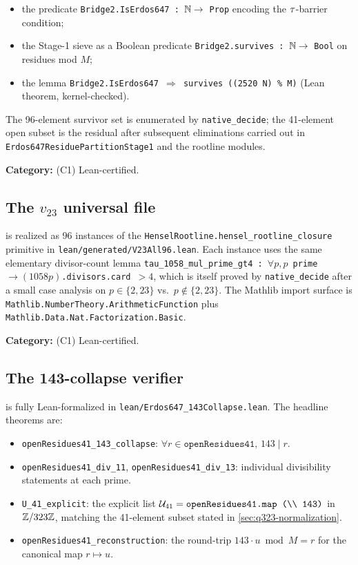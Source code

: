 \begin{itemize}[leftmargin=*]
\item the predicate \texttt{Bridge2.IsErdos647 : $\mathbb{N} \to$ Prop}
  encoding the $\tau$-barrier condition;
\item the Stage-1 sieve as a Boolean predicate
  \texttt{Bridge2.survives : $\mathbb{N} \to$ Bool} on residues mod $M$;
\item the lemma
  \texttt{Bridge2.IsErdos647 $\Rightarrow$ survives ((2520 N) \% M)}
  (Lean theorem, kernel-checked).
\end{itemize}

The 96-element survivor set is enumerated by
\texttt{native\_decide}; the 41-element open subset is the residual
after subsequent eliminations carried out in
\texttt{Erdos647ResiduePartitionStage1} and the rootline modules.

\textbf{Category:} (C1) Lean-certified.

\subsection{The $v_{23}$ universal file}
\label{sec:lean-v23}

 is realized as 96 instances of the
\texttt{HenselRootline.hensel\_rootline\_closure} primitive in
\texttt{lean/generated/V23All96.lean}. Each instance uses the same
elementary divisor-count lemma
\texttt{tau\_1058\_mul\_prime\_gt4 : $\forall p, p$ prime $\to (1058 p)$.divisors.card $> 4$},
which is itself proved by \texttt{native\_decide} after a small case
analysis on $p \in \{2, 23\}$ vs.\ $p \notin \{2, 23\}$. The Mathlib
import surface is \texttt{Mathlib.NumberTheory.ArithmeticFunction}
plus \texttt{Mathlib.Data.Nat.Factorization.Basic}.

\textbf{Category:} (C1) Lean-certified.

\subsection{The 143-collapse verifier}
\label{sec:lean-143}

 is fully Lean-formalized in
\texttt{lean/Erdos647\_143Collapse.lean}. The headline theorems are:

\begin{itemize}[leftmargin=*]
\item \texttt{openResidues41\_143\_collapse}: $\forall r \in
  \texttt{openResidues41},\, 143 \mid r$.
\item \texttt{openResidues41\_div\_11}, \texttt{openResidues41\_div\_13}:
  individual divisibility statements at each prime.
\item \texttt{U\_41\_explicit}: the explicit list
  $\mathcal{U}_{41} = \texttt{openResidues41.map (\textbackslash{}\textbackslash{} 143)}$
  in $\mathbb{Z} / 323\mathbb{Z}$, matching the 41-element subset stated in
  \cref{sec:q323-normalization}.
\item \texttt{openResidues41\_reconstruction}: the round-trip
  $143 \cdot u \bmod M = r$ for the canonical map $r \mapsto u$.
\end{itemize}

